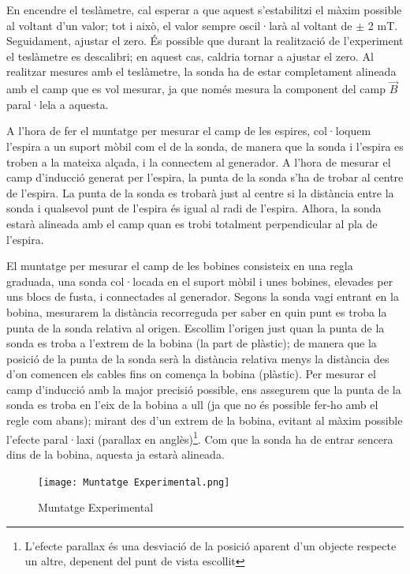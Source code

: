 \documentclass[11pt]{article}
\numberwithin{equation}{section}
\numberwithin{figure}{section}
\numberwithin{table}{section}
\begin{document}
En encendre el teslàmetre, cal esperar a que aquest s'estabilitzi el màxim possible al voltant d'un valor; tot i això, el valor sempre oscil·larà al voltant de $\pm$ 2 mT. Seguidament, ajustar el zero. És possible que durant la realització de l'experiment el teslàmetre es descalibri; en aquest cas, caldria tornar a ajustar el zero. Al realitzar mesures amb el teslàmetre, la sonda ha de estar completament alineada amb el camp que es vol mesurar, ja que només mesura la component del camp $\vec{B}$ paral·lela a aquesta.

A l'hora de fer el muntatge per mesurar el camp de les espires, col·loquem l'espira a un suport mòbil com el de la sonda, de manera que la sonda i l'espira es troben a la mateixa alçada, i la connectem al generador. A l'hora de mesurar el camp d'inducció generat per l'espira, la punta de la sonda s'ha de trobar al centre de l'espira. La punta de la sonda es trobarà just al centre si la distància entre la sonda i qualsevol punt de l'espira és igual al radi de l'espira. Alhora, la sonda estarà alineada amb el camp quan es trobi totalment perpendicular al pla de l'espira. 


El muntatge per mesurar el camp de les bobines consisteix en una regla graduada, una sonda col·locada en el suport mòbil i unes bobines, elevades per uns blocs de fusta, i connectades al generador. 
Segons la sonda vagi entrant en la bobina, mesurarem la distància recorreguda per saber en quin punt es troba la punta de la sonda relativa al origen. Escollim l'origen just quan la punta de la sonda es troba a l'extrem de la bobina (la part de plàstic); de manera que la posició de la punta de la sonda serà la distància relativa menys la distància des d'on comencen els cables fins on comença la bobina (plàstic).
Per mesurar el camp d'inducció amb la major precisió possible, ens assegurem que la punta de la sonda es troba en l'eix de la bobina a ull (ja que no és possible fer-ho amb el regle com abans); mirant des d'un extrem de la bobina, evitant al màxim possible l'efecte paral·laxi (parallax en anglès)\footnote{L'efecte parallax és una desviació de la posició aparent d'un objecte respecte un altre, depenent del punt de vista escollit}. Com que la sonda ha de entrar sencera dins de la bobina, aquesta ja estarà alineada.



\begin{figure}[H]
    \centering
    \texttt{[image: Muntatge Experimental.png]}
    \caption{Muntatge Experimental}
    \label{fig: muntatge}
\end{figure}
\end{document}
